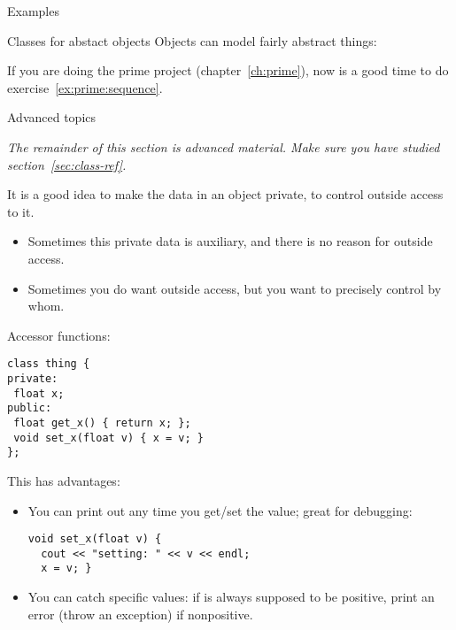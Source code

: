 \begin{comment}
  \begin{exercise}
    \label{ex:geom:twoconstruct}
    Write a \n{Point} class that has two constructors:
\begin{lstlisting}
class Point {
private:
  // data members
public:
  Point( float x,float y ) { /* ... */ };
  Point( float r,float theta ) { /* ... */ };
  float get_x() { /* ... */ };
  float get_y() { /* ... */ };
  float get_r() { /* ... */ };
  float get_theta() { /* ... */ };
};
\end{lstlisting}
Use $r,\theta$ for the private variables, do not store $x,y$.
  \end{exercise}
\end{comment}

 {Examples}

\begin{block}{Classes for abstact objects}
  \label{sl:intstream}
  Objects can model fairly abstract things:
\end{block}

\begin{exercise}
  If you are doing the prime project (chapter~\ref{ch:prime}),
  now is a good time to do exercise~\ref{ex:prime:sequence}.
\end{exercise}

 {Advanced topics}

\emph{The remainder of this section is advanced material. Make sure
  you have studied section~\ref{sec:class-ref}.}

It is a good idea to make the data in an object private,
to control outside access to it.
\begin{itemize}
\item Sometimes this private data is auxiliary, and there is no reason
  for outside access.
\item Sometimes you do want outside access, but you want to precisely
  control by whom.
\end{itemize}

Accessor functions:
\begin{lstlisting}
class thing {
private:
 float x;
public:
 float get_x() { return x; };
 void set_x(float v) { x = v; }
};
\end{lstlisting}
This has advantages:
\begin{itemize}
\item You can print out any time you get/set the value; great for
  debugging:
\begin{lstlisting}
void set_x(float v) {
  cout << "setting: " << v << endl;
  x = v; }
\end{lstlisting}
\item You can catch specific values: if  is always supposed to be
  positive, print an error (throw an exception) if nonpositive.
\end{itemize}

